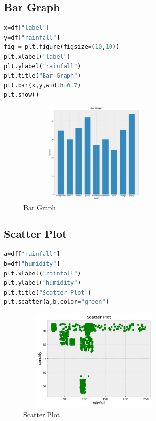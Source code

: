 \subsection{Bar Graph}
\begin{lstlisting}[language=Python,basicstyle=\fontsize{9}{11}\selectfont]
x=df["label"]
y=df["rainfall"]
fig = plt.figure(figsize=(10,10))
plt.xlabel("label")
plt.ylabel("rainfall")
plt.title("Bar Graph")
plt.bar(x,y,width=0.7)
plt.show()
\end{lstlisting}
\begin{figure}[h]
\centering
 \footnotesize
 \includegraphics[width=3in,height=2in]{bar.png}
\caption{Bar Graph}
\label{fig:dunnhalftone}
\end{figure}
\subsection{Scatter Plot}
\begin{lstlisting}[language=Python,basicstyle=\fontsize{9}{11}\selectfont]
a=df["rainfall"]
b=df["humidity"]
plt.xlabel("rainfall")
plt.ylabel("humidity")
plt.title("Scatter Plot")
plt.scatter(a,b,color="green")
\end{lstlisting}
\begin{figure}[h]
\centering
 \footnotesize
 \includegraphics[width=3in,height=2in]{scatter.png}
\caption{Scatter Plot}
\label{fig:dunnhalftone}
\end{figure}
